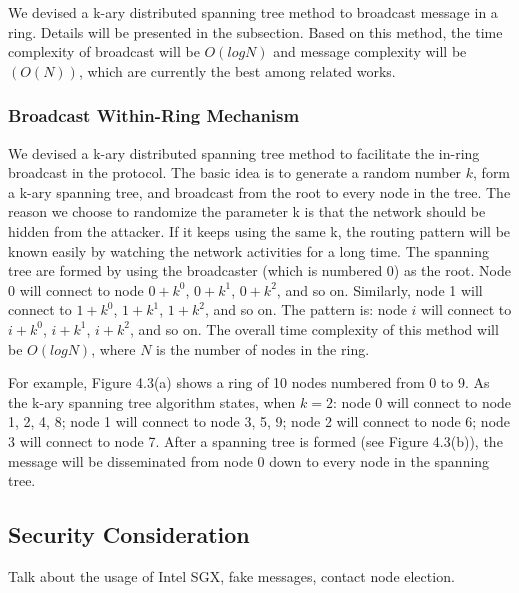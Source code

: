 We devised a k-ary distributed spanning tree method to broadcast message in a ring. Details will be presented in the subsection. Based on this method, the time complexity of broadcast will be $O(logN)$ and message complexity will be $(O(N))$, which are currently the best among related works.

\subsubsection{Broadcast Within-Ring Mechanism}

We devised a k-ary distributed spanning tree method to facilitate the in-ring broadcast in the protocol. The basic idea is to generate a random number $k$, form a k-ary spanning tree, and broadcast from the root to every node in the tree. The reason we choose to randomize the parameter k is that the network should be hidden from the attacker. If it keeps using the same k, the routing pattern will be known easily by watching the network activities for a long time. The spanning tree are formed by using the broadcaster (which is numbered 0) as the root. Node 0 will connect to node $0+k^0$, $0+k^1$, $0+k^2$, and so on. Similarly, node 1 will connect to $1+k^0$, $1+k^1$, $1+k^2$, and so on. The pattern is: node $i$ will connect to $i+k^0$, $i+k^1$, $i+k^2$, and so on. The overall time complexity of this method will be $O(logN)$, where $N$ is the number of nodes in the ring. 

For example, Figure 4.3(a) shows a ring of 10 nodes numbered from 0 to 9. As the k-ary spanning tree algorithm states, when $k=2$: node 0 will connect to node 1, 2, 4, 8; node 1 will connect to node 3, 5, 9; node 2 will connect to node 6; node 3 will connect to node 7. After a spanning tree is formed (see Figure 4.3(b)), the message will be disseminated from node 0 down to every node in the spanning tree.


\subsection{Security Consideration} \label{security}

Talk about the usage of Intel SGX, fake messages, contact node election.